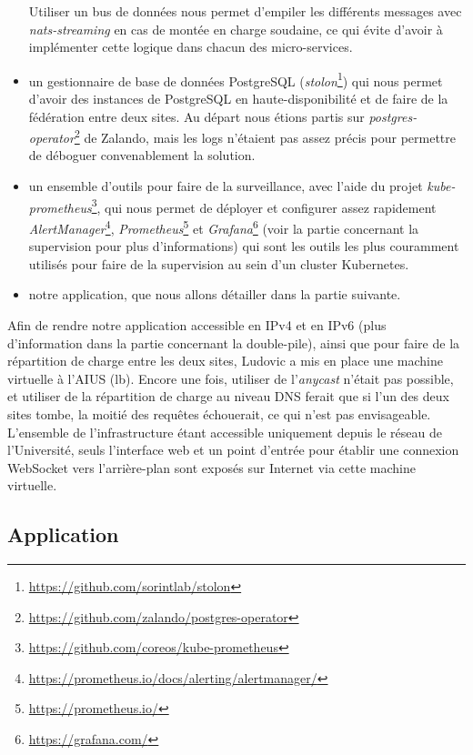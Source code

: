 \begin{itemize}
  Utiliser un bus de données nous permet d'empiler les différents
  messages avec \textit{nats-streaming} en cas de montée en charge
  soudaine, ce qui évite d'avoir à implémenter cette logique dans chacun
  des micro-services.
\item
  un gestionnaire de base de données PostgreSQL
  (\textit{stolon}\footnote{\url{https://github.com/sorintlab/stolon}})
  qui nous permet d'avoir des instances de PostgreSQL en
  haute-disponibilité et de faire de la fédération entre deux sites. Au
  départ nous étions partis sur
  \textit{postgres-operator}\footnote{
    \url{https://github.com/zalando/postgres-operator}}
  de Zalando, mais les logs n'étaient pas assez précis pour permettre de
  déboguer convenablement la solution.
\item
  un ensemble d'outils pour faire de la surveillance, avec l'aide du
  projet \textit{kube-prometheus}\footnote{
    \url{https://github.com/coreos/kube-prometheus}},
  qui nous permet de déployer et configurer assez rapidement
  \textit{AlertManager}\footnote{
    \url{https://prometheus.io/docs/alerting/alertmanager/}},
  \textit{Prometheus}\footnote{\url{https://prometheus.io/}} et
  \textit{Grafana}\footnote{\url{https://grafana.com/}} (voir
  la partie concernant la supervision pour plus d'informations) qui sont
  les outils les plus couramment utilisés pour faire de la supervision
  au sein d'un cluster Kubernetes.
\item
  notre application, que nous allons détailler dans la partie suivante.
\end{itemize}

Afin de rendre notre application accessible en IPv4 et en IPv6 (plus
d'information dans la partie concernant la double-pile), ainsi que pour
faire de la répartition de charge entre les deux sites, Ludovic a mis en
place une machine virtuelle à l'AIUS (lb). Encore une fois, utiliser de
l'\textit{anycast} n'était pas possible, et utiliser de la répartition de
charge au niveau DNS ferait que si l'un des deux sites tombe, la moitié
des requêtes échouerait, ce qui n'est pas envisageable. L'ensemble de
l'infrastructure étant accessible uniquement depuis le réseau de
l'Université, seuls l'interface web et un point d'entrée pour établir
une connexion WebSocket vers l'arrière-plan sont exposés sur Internet
via cette machine virtuelle.

\subsection{Application}

